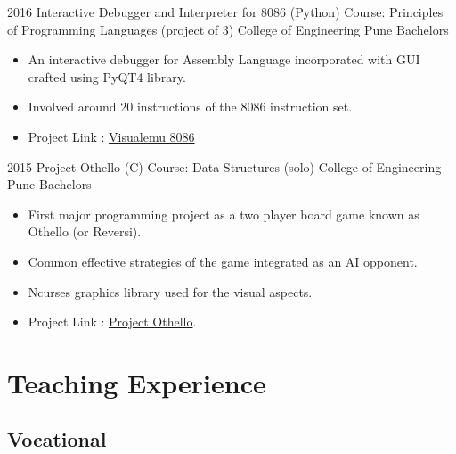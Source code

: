 \documentclass[11pt,a4paper,sans]{moderncv} %
\begin{document}
        \cventry
            {2016} %
            {Interactive Debugger and Interpreter for 8086 (Python)} %
            {Course: Principles of Programming Languages (project of 3)} %
            {College of Engineering Pune} %
            {Bachelors} 
            {
                \begin{itemize} %
                    \item An interactive debugger for Assembly Language incorporated with GUI crafted using PyQT4 library.
                    \item Involved around 20 instructions of the 8086 instruction set.
                    \item Project Link : \href{https://github.com/jaag5678/visualemu8086}{Visualemu 8086}
                \end{itemize}
            }
            {}

        \cventry
            {2015} %
            {Project Othello (C)} %
            {Course: Data Structures (solo)} %
            {College of Engineering Pune} %
            {Bachelors} 
            {
                \begin{itemize} %
                    \item First major programming project as a two player board game known as Othello (or Reversi).
                    \item Common effective strategies of the game integrated as an AI opponent.
                    \item Ncurses graphics library used for the visual aspects.
                    \item Project Link : \href{https://github.com/jaag5678/Reverse-Rebirth.git}{Project Othello}.
                \end{itemize}
            }
            {}
        
    
\section{Teaching Experience}

\subsection{Vocational}
\end{document}
